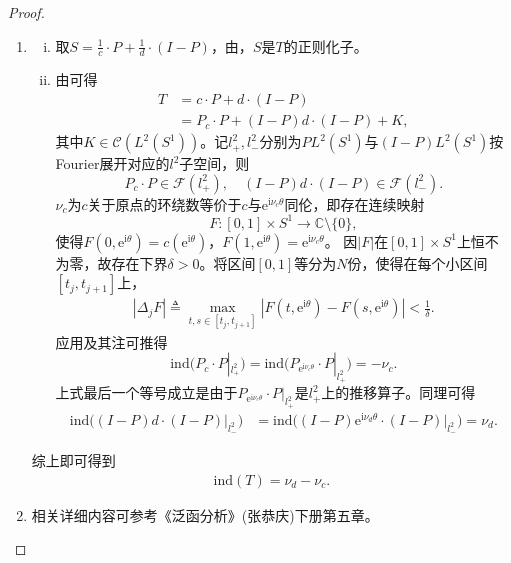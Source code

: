 \documentclass[../../main.tex]{subfiles}%
\begin{document}
\begin{proof}
\begin{enumerate}[(1)]
\item \begin{enumerate}[(i)]
\item 取$S = \frac{1}{c}\cdot P + \frac{1}{d}\cdot(I-P)$，由，$S$是$T$的正则化子。
\item 由可得
\begin{align*}
T &= c\cdot P + d\cdot(I-P) \\
&= P_c\cdot P + (I-P)d\cdot(I-P) + K,
\end{align*}
其中$K \in \mathscr{C}(L^2(S^1))$。记$l_+^2,l_-^2$分别为$PL^2(S^1)$与$(I-P)L^2(S^1)$按Fourier展开对应的$l^2$子空间，则
$$P_c\cdot P \in \mathscr{F}(l_+^2),\quad (I-P)d\cdot(I-P) \in \mathscr{F}(l_-^2).$$
$\nu_c$为$c$关于原点的环绕数等价于$c$与$\mathrm{e}^{\mathrm{i}\nu_c\theta}$同伦，即存在连续映射
$$F:[0,1]\times S^1 \to \mathbb{C}\setminus\{0\},$$
使得$F(0,\mathrm{e}^{\mathrm{i}\theta})=c(\mathrm{e}^{\mathrm{i}\theta})$，$F(1,\mathrm{e}^{\mathrm{i}\theta})=\mathrm{e}^{\mathrm{i}\nu_c\theta}$。
因$|F|$在$[0,1]\times S^1$上恒不为零，故存在下界$\delta>0$。将区间$[0,1]$等分为$N$份，使得在每个小区间$[t_j,t_{j+1}]$上，
\begin{align*}
|\Delta_j F| \triangleq \max_{t,s\in[t_j,t_{j+1}]}|F(t,\mathrm{e}^{\mathrm{i}\theta})-F(s,\mathrm{e}^{\mathrm{i}\theta})| < \frac{1}{\delta}.
\end{align*}
应用及其注可推得
$$\mathrm{ind}\big(P_c\cdot P|_{l_+^2}\big) = \mathrm{ind}\big(P_{\mathrm{e}^{\mathrm{i}\nu_c\theta}}\cdot P|_{l_+^2}\big) = -\nu_c.$$
上式最后一个等号成立是由于$P_{\mathrm{e}^{\mathrm{i}\nu_c\theta}}\cdot P|_{l_+^2}$是$l_+^2$上的推移算子。同理可得
\begin{align*}
\mathrm{ind}\big((I-P)d\cdot(I-P)|_{l_-^2}\big) &= \mathrm{ind}\big((I-P)\mathrm{e}^{\mathrm{i}\nu_d\theta}\cdot(I-P)|_{l_-^2}\big) = \nu_d.
\end{align*}
\end{enumerate}
综上即可得到
\begin{align*}
\mathrm{ind}(T) = \nu_d - \nu_c.
\end{align*}

\item 相关详细内容可参考《泛函分析》(张恭庆)下册第五章。
\end{enumerate}
\end{proof}
\end{document}
